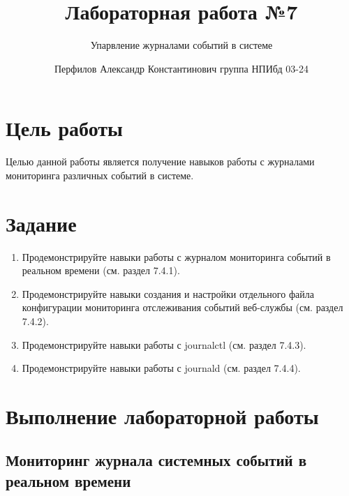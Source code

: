 \documentclass[
  english,
  russian,
  12pt,
  a4paper,
  DIV=11,
  numbers=noendperiod]{scrreprt}
\title{Лабораторная работа №7}
\subtitle{Упарвление журналами событий в системе}
\author{Перфилов Александр Константинович \textbar{} группа НПИбд 03-24}
\date{}
\providecommand{\tightlist}{%
  \setlength{\itemsep}{0pt}\setlength{\parskip}{0pt}}
\renewcommand*\contentsname{Содержание}
\newcommand\contentsname{Содержание}
\begin{document}
\maketitle

\renewcommand*\contentsname{Содержание}
{
\setcounter{tocdepth}{1}
\tableofcontents
}
\listoffigures
\listoftables

\chapter{Цель
работы}\label{ux446ux435ux43bux44c-ux440ux430ux431ux43eux442ux44b}

Целью данной работы является получение навыков работы с журналами
мониторинга различных событий в системе.

\chapter{Задание}\label{ux437ux430ux434ux430ux43dux438ux435}

\begin{enumerate}
\def\labelenumi{\arabic{enumi}.}
\tightlist
\item
  Продемонстрируйте навыки работы с журналом мониторинга событий в
  реальном времени (см. раздел 7.4.1).
\item
  Продемонстрируйте навыки создания и настройки отдельного файла
  конфигурации мониторинга отслеживания событий веб-службы (см. раздел
  7.4.2).
\item
  Продемонстрируйте навыки работы с journalctl (см. раздел 7.4.3).
\item
  Продемонстрируйте навыки работы с journald (см. раздел 7.4.4).
\end{enumerate}

\chapter{Выполнение лабораторной
работы}\label{ux432ux44bux43fux43eux43bux43dux435ux43dux438ux435-ux43bux430ux431ux43eux440ux430ux442ux43eux440ux43dux43eux439-ux440ux430ux431ux43eux442ux44b}

\section{Мониторинг журнала системных событий в реальном
времени}\label{ux43cux43eux43dux438ux442ux43eux440ux438ux43dux433-ux436ux443ux440ux43dux430ux43bux430-ux441ux438ux441ux442ux435ux43cux43dux44bux445-ux441ux43eux431ux44bux442ux438ux439-ux432-ux440ux435ux430ux43bux44cux43dux43eux43c-ux432ux440ux435ux43cux435ux43dux438}
\end{document}
